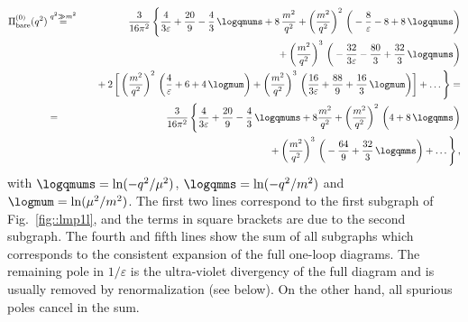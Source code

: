\begin{eqnarray}
  \Pi^{(0)}_{\rm bare}(q^2)  
&\stackrel{q^2\gg m^2}{=}&
{3\over 16\pi^2}\,\Bigg\{
  {4\over 3 \varepsilon}
  + {20\over 9} 
  - {4\over 3}\,\logqmums
  + 8\,{m^2\over q^2}
  + \left({m^2\over q^2}\right)^2\,\bigg( 
    - {8\over\varepsilon} 
    - 8
    + 8\,\logqmums
  \bigg)
  \nonumber\\&&\mbox{\hspace{3em}}
  + \left({m^2\over q^2}\right)^3\,\bigg( 
    - {32\over 3 \varepsilon} 
    - {80\over 3} + {32\over 3}\,\logqmums
  \bigg)
  \nonumber\\&&\mbox{\hspace{1em}}
  + 2\,\bigg[\left({m^2\over q^2}\right)^2\,\bigg(
    {4\over \varepsilon}
    + 6
    + 4\,\logmum
  \bigg)
  + \left({m^2\over q^2}\right)^3\,\bigg( 
    {16\over 3 \varepsilon}
    + {88\over 9} 
    + {16\over 3}\,\logmum
  \bigg)
  \bigg]
  + \ldots
  \Bigg\}= 
  \nonumber\\
  &=&
  {3\over 16\pi^2}\,\Bigg\{  
  {4\over 3\varepsilon}
  + {20\over 9} - {4\over 3}\,\logqmums
  + 8 {m^2\over q^2}
  + \left({m^2\over q^2}\right)^2\,\bigg( 
    4 
    + 8\,\logqmms
  \bigg)
  \nonumber\\&&\mbox{\hspace{3em}}
  + \left({m^2\over q^2}\right)^3\,\bigg( 
    - {64\over 9} 
    + {32\over 3}\,\logqmms 
  \bigg)
+\ldots
  \Bigg\}\,,
  \label{eq::lmp1l}
\end{eqnarray}
%
with $\logqmums=\ln(-q^2/\mu^2)$, $\logqmms=\ln(-q^2/m^2)$ and
$\logmum=\ln(\mu^2/m^2)$.  The first two lines correspond to the first
subgraph of Fig.~\ref{fig::lmp1l}, and the terms in square brackets are
due to the second subgraph.  The fourth and fifth lines show the sum of
all subgraphs which corresponds to the consistent expansion of the full
one-loop diagrams.  The remaining pole in $1/\varepsilon$ is the
ultra-violet divergency of the full diagram and is usually removed by
renormalization (see below). On the other hand, all spurious poles
cancel in the sum.


